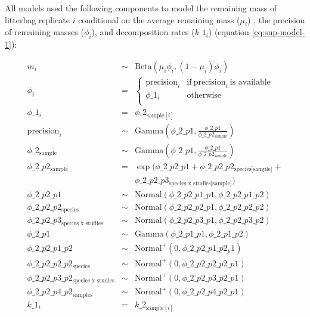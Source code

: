 \documentclass[
  12pt,
]{article}
\begin{document}
All models used the following components to model the remaining mass of litterbag replicate \(i\) conditional on the average remaining mass (\(\mu_i\)) , the precision of remaining masses (\(\phi_i\)), and decomposition rates (\(k\_1_i\)) (equation \eqref{eq:sup-model-1}):

\begin{equation}
\begin{aligned}
m_i & \sim & \text{Beta}(\mu_i\phi_{i},(1 - \mu_i)\phi_{i})\\
\phi_{i} & = & \begin{cases}
\text{precision}_i & \text{if}~\text{precision}_i~\text{is available}\\
\phi\_1_{i} & \text{otherwise}\\
\end{cases}\\
\phi\_1_{i} & = & \phi\_2_{\text{sample}[i]}\\
\text{precision}_i & \sim & \text{Gamma}\left(\phi\_2\_p1, \frac{\phi\_2\_p1}{\phi\_2\_p2_{\text{sample}}}\right)\\
\phi\_2_{\text{sample}} & \sim & \text{Gamma}\left(\phi\_2\_p1, \frac{\phi\_2\_p1}{\phi\_2\_p2_{\text{sample}}}\right)\\
\phi\_2\_p2_{\text{sample}} & = & \exp(\phi\_2\_p2\_p1 + \phi\_2\_p2\_p2_{\text{species[sample]}} + \\
                                && \phi\_2\_p2\_p3_{\text{species x studies[sample]}})\\
\phi\_2\_p2\_p1 & \sim & \text{Normal}(\phi\_2\_p2\_p1\_p1, \phi\_2\_p2\_p1\_p2)\\
\phi\_2\_p2\_p2_{\text{species}} & \sim & \text{Normal}(\phi\_2\_p2\_p2\_p1, \phi\_2\_p2\_p2\_p2)\\
\phi\_2\_p2\_p3_{\text{species x studies}} & \sim & \text{Normal}(\phi\_2\_p2\_p3\_p1, \phi\_2\_p2\_p3\_p2)\\
\phi\_2\_p1 & \sim & \text{Gamma}(\phi\_2\_p1\_p1, \phi\_2\_p1\_p2)\\
\phi\_2\_p2\_p1\_p2 & \sim & \text{Normal}^+(0, \phi\_2\_p2\_p1\_p2_p1)\\
\phi\_2\_p2\_p2\_p2_{\text{species}} & \sim & \text{Normal}^+(0, \phi\_2\_p2\_p2\_p2\_p1)\\
\phi\_2\_p2\_p3\_p2_{\text{species x studies}} & \sim & \text{Normal}^+(0, \phi\_2\_p2\_p3\_p2\_p1)\\
\phi\_2\_p2\_p4\_p2_{\text{samples}} & \sim & \text{Normal}^+(0, \phi\_2\_p2\_p4\_p2\_p1)\\
k\_1_i & = & k\_2_{\text{sample}[i]}\\

\end{aligned}
\end{equation}
\end{document}
